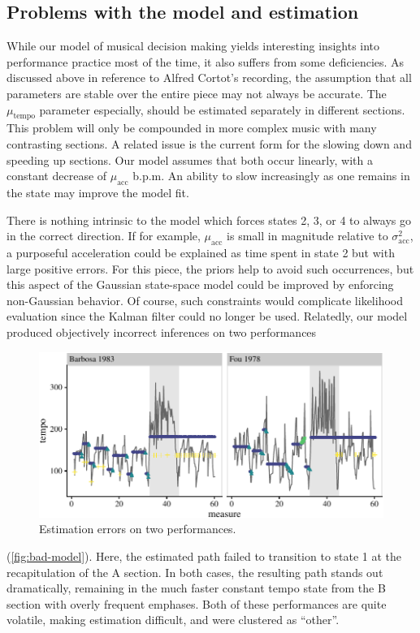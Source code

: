 \documentclass[aoas]{imsart}
\begin{document}
\subsection{Problems with the model and estimation}
\label{sec:problems-with-model}

While our model of musical decision making yields interesting insights
into performance practice most of the time, it also suffers from some
deficiencies. As discussed above in reference to Alfred Cortot's
recording, the assumption that all parameters are stable over the
entire piece may not always be accurate. The $\mu_{\textrm{tempo}}$
parameter especially, should be estimated separately in different
sections. This problem will only be compounded in more complex music
with many contrasting sections. A related issue is the current form
for the slowing down and speeding up sections. Our model assumes that
both occur linearly, with a constant decrease of $\mu_{\textrm{acc}}$
b.p.m. An ability to slow increasingly as one remains in the state may
improve the model fit.

There is nothing intrinsic to the model which forces states 2,
3, or 4 to always go in the correct direction. If for example,
$\mu_{\textrm{acc}}$ is small in magnitude relative to
$\sigma^2_{\textrm{acc}}$, a purposeful acceleration could be explained as time
spent in state 2 but with large positive errors. For this piece, the
priors help to avoid such occurrences, but this aspect of the
Gaussian state-space model could be improved by enforcing non-Gaussian
behavior. Of course, such constraints would complicate likelihood
evaluation since the Kalman filter could no longer be used. Relatedly,
our model produced objectively incorrect inferences on two performances
\begin{figure}[t]
  \centering
  \includegraphics[width=.9\linewidth]{bad-model-1}
  \caption{Estimation errors on two performances.}
  \label{fig:bad-model}
\end{figure}
(\autoref{fig:bad-model}). Here, the estimated
path failed to transition to state 1 at the
recapitulation of the A section. In both cases, the resulting path
stands out dramatically, remaining in the much faster constant tempo
state from the B section with overly frequent emphases. Both of these
performances are quite volatile, making estimation difficult, and were clustered as ``other''. 
\end{document}
